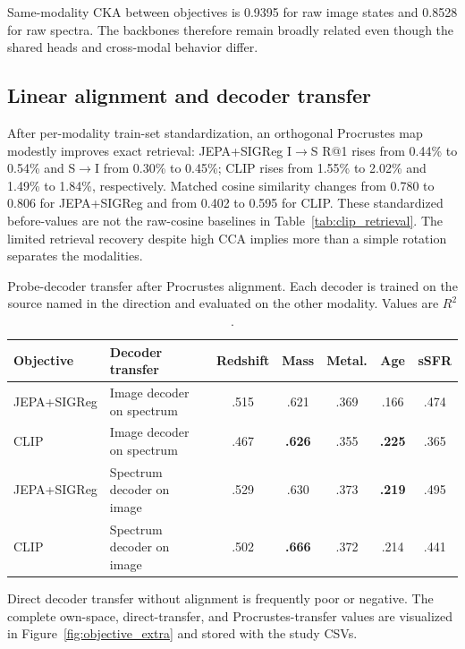 \documentclass{article}
\newcommand{\rscore}{$R^2$}
\begin{document}
\FloatBarrier
Same-modality CKA between objectives is 0.9395 for raw image states and 0.8528
for raw spectra.
The backbones therefore remain broadly related even though the shared heads and
cross-modal behavior differ.

\subsection{Linear alignment and decoder transfer}

After per-modality train-set standardization, an orthogonal Procrustes map
modestly improves exact retrieval:
JEPA+SIGReg I$\rightarrow$S R@1 rises from 0.44\% to 0.54\% and
S$\rightarrow$I from 0.30\% to 0.45\%;
CLIP rises from 1.55\% to 2.02\% and 1.49\% to 1.84\%, respectively.
Matched cosine similarity changes from 0.780 to 0.806 for JEPA+SIGReg and from
0.402 to 0.595 for CLIP.
These standardized before-values are not the raw-cosine baselines in
Table~\ref{tab:clip_retrieval}.
The limited retrieval recovery despite high CCA implies more than a simple
rotation separates the modalities.

\begin{table}[h]
\centering
\caption{Probe-decoder transfer after Procrustes alignment. Each decoder is
trained on the source named in the direction and evaluated on the other
modality. Values are \rscore.}
\label{tab:decoder_transfer}
\scriptsize
\setlength{\tabcolsep}{3.6pt}
\begin{tabular}{llccccc}
\toprule
Objective & Decoder transfer & Redshift & Mass & Metal. & Age & sSFR\\
\midrule
JEPA+SIGReg & Image decoder on spectrum & .515 & .621 & .369 & .166 & .474\\
CLIP & Image decoder on spectrum & .467 & \textbf{.626} & .355 & \textbf{.225} & .365\\
JEPA+SIGReg & Spectrum decoder on image & .529 & .630 & .373 & \textbf{.219} & .495\\
CLIP & Spectrum decoder on image & .502 & \textbf{.666} & .372 & .214 & .441\\
\bottomrule
\end{tabular}
\end{table}

\FloatBarrier
Direct decoder transfer without alignment is frequently poor or negative.
The complete own-space, direct-transfer, and Procrustes-transfer values are
visualized in Figure~\ref{fig:objective_extra} and stored with the study CSVs.
\end{document}
